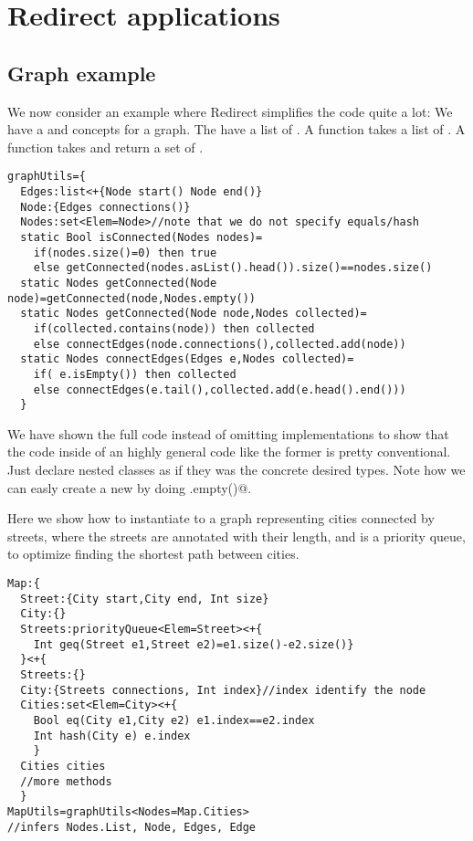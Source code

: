 \section{Redirect applications}

\subsection{Graph example}
We now consider an example where Redirect simplifies the code quite a lot:
We have a \Q@Node@ and \Q@Edge@ concepts for a graph.
The \Q@Node@ have a list of \Q@Edge@s.
A \Q@isConnected@ function takes a list of \Q@Node@s.
A \Q@getConnected@ function takes \Q@Node@ and return a set of \Q@Node@s.
\begin{lstlisting}
graphUtils={
  Edges:list<+{Node start() Node end()}
  Node:{Edges connections()}
  Nodes:set<Elem=Node>//note that we do not specify equals/hash
  static Bool isConnected(Nodes nodes)=
    if(nodes.size()=0) then true
    else getConnected(nodes.asList().head()).size()==nodes.size()
  static Nodes getConnected(Node node)=getConnected(node,Nodes.empty())
  static Nodes getConnected(Node node,Nodes collected)=
    if(collected.contains(node)) then collected
    else connectEdges(node.connections(),collected.add(node))
  static Nodes connectEdges(Edges e,Nodes collected)=
    if( e.isEmpty()) then collected
    else connectEdges(e.tail(),collected.add(e.head().end()))
  }
\end{lstlisting}

We have shown the full code instead of omitting implementations to show that
the code inside of an highly general code like the former is pretty conventional.
Just declare nested classes as if they was the concrete desired types. Note how we can easly create a new \@Nodes@ by doing \Q@Nodes.empty()@.

Here we show how to instantiate \Q@graphUtils@ to a graph representing cities connected by streets,
where the streets are annotated with their length, and \Q@Edges@ is a priority queue, to optimize
finding the shortest path between cities.

\begin{lstlisting}
Map:{
  Street:{City start,City end, Int size}
  City:{}
  Streets:priorityQueue<Elem=Street><+{    
    Int geq(Street e1,Street e2)=e1.size()-e2.size()}
  }<+{
  Streets:{}
  City:{Streets connections, Int index}//index identify the node
  Cities:set<Elem=City><+{
    Bool eq(City e1,City e2) e1.index==e2.index
    Int hash(City e) e.index
    }
  Cities cities
  //more methods
  }
MapUtils=graphUtils<Nodes=Map.Cities>
//infers Nodes.List, Node, Edges, Edge
\end{lstlisting}


